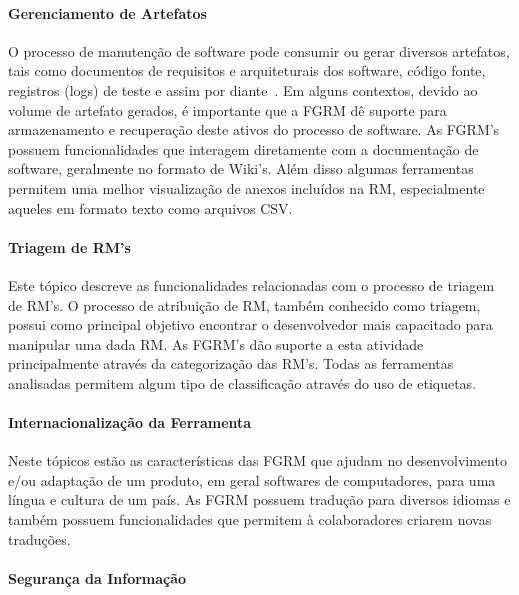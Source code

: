 \paragraph{Gerenciamento de Artefatos}
\label{par:gerenciamento_de_artefatos}

O processo de manutenção de software pode consumir ou gerar diversos artefatos,
tais como documentos de requisitos e arquiteturais dos software, código fonte,
registros (logs) de teste e assim por diante~\cite{cavalcanti2013bug}. Em alguns
contextos, devido ao volume de artefato gerados, é importante que a FGRM dê
suporte para armazenamento e recuperação deste ativos do processo de software.
As FGRM's possuem funcionalidades que interagem diretamente com a documentação
de software, geralmente no formato de Wiki's. Além disso algumas ferramentas
permitem uma melhor visualização de anexos incluídos na RM, especialmente
aqueles em formato texto como arquivos CSV.

\paragraph{Triagem de RM's}
\label{par:triagem_de_rm_s}

Este tópico descreve as funcionalidades relacionadas com o processo de triagem
de RM's. O processo de atribuição de RM, também conhecido como triagem, possui
como principal objetivo encontrar o desenvolvedor mais capacitado para manipular
uma dada RM\@. As FGRM's dão suporte a esta atividade principalmente através da
categorização das RM's. Todas as ferramentas analisadas permitem algum tipo de
classificação através do uso de etiquetas.

\paragraph{Internacionalização da Ferramenta}
\label{par:internacionalização_da_ferramenta}

Neste tópicos estão as características das FGRM que ajudam no desenvolvimento
e/ou adaptação de um produto, em geral softwares de computadores, para uma
língua e cultura de um país. As FGRM possuem tradução para diversos idiomas e
também possuem funcionalidades que permitem à colaboradores criarem novas
traduções.

\paragraph{Segurança da Informação}
\label{par:segurança_da_informação}

